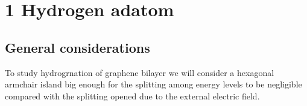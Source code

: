 \section{1 Hydrogen adatom}
\subsection{General considerations} %
To study hydrogrnation of graphene bilayer we will consider a hexagonal armchair island big enough for the splitting among energy levels to be negligible compared with the splitting opened due to the external electric field.

